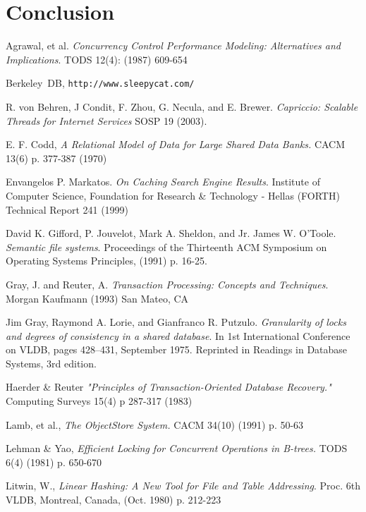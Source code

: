 \documentclass[letterpaper,english]{article}
\begin{document}
\section{Conclusion}


\begin{thebibliography}{99}

 Agrawal, et al. {\em Concurrency Control Performance Modeling: Alternatives and Implications}. TODS 12(4): (1987) 609-654

 Berkeley~DB, {\tt http://www.sleepycat.com/}

 R. von Behren, J Condit, F. Zhou, G. Necula, and E. Brewer. {\em Capriccio: Scalable Threads for Internet Services} SOSP 19 (2003).

 E. F. Codd, {\em A Relational Model of Data for Large Shared Data Banks.} CACM 13(6) p. 377-387 (1970)

 Envangelos P. Markatos. {\em On Caching Search Engine Results}.  Institute of Computer Science, Foundation for Research \& Technology - Hellas (FORTH) Technical Report 241 (1999)

 David K. Gifford, P. Jouvelot, Mark A. Sheldon, and Jr. James W. O'Toole. {\em Semantic file systems}. Proceedings of the Thirteenth ACM Symposium on Operating Systems Principles, (1991) p. 16-25.

 Gray, J. and Reuter, A. {\em Transaction Processing: Concepts and Techniques}. Morgan Kaufmann (1993) San Mateo, CA

 Jim Gray, Raymond A. Lorie, and Gianfranco R. Putzulo. {\em Granularity of locks and degrees of consistency in a shared database}. In 1st International Conference on VLDB, pages 428--431, September 1975. Reprinted in Readings in Database Systems, 3rd edition.

 Haerder \& Reuter {\em "Principles of Transaction-Oriented Database Recovery." } Computing Surveys 15(4) p 287-317 (1983)

 Lamb, et al., {\em The ObjectStore System.} CACM 34(10) (1991) p. 50-63

 Lehman \& Yao, {\em Efficient Locking for Concurrent Operations in B-trees.} TODS 6(4) (1981) p. 650-670

 Litwin, W., {\em Linear Hashing: A New Tool for File and Table Addressing}. Proc. 6th VLDB, Montreal, Canada, (Oct. 1980) p. 212-223


\end{thebibliography}
\end{document}

